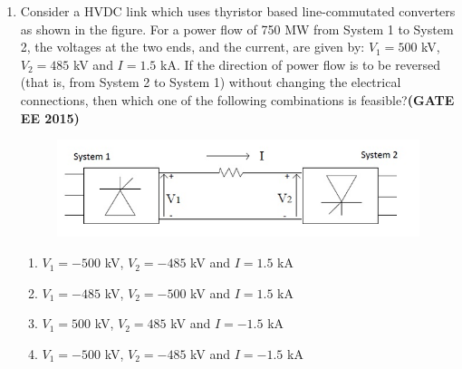 \documentclass[a4paper,12pt]{exam}
\theoremstyle{remark}
\begin{document}
\begin{enumerate}
\begin{multicols}{4}
\begin{enumerate}
        \item 1010
        \item 0110
        \item 1000
        \item 1110
    \end{enumerate}
\end{multicols}
\item Consider a HVDC link which uses thyristor based line-commutated converters as shown in the figure. For a power flow of 750 MW from System 1 to System 2, the voltages at the two ends, and the current, are given by: $V_1 = 500$ kV, $V_2 = 485$ kV and $I = 1.5$ kA. If the direction of power flow is to be reversed (that is, from System 2 to System 1) without changing the electrical connections, then which one of the following combinations is feasible?\hfill{\textbf{(GATE EE 2015)}}
\begin{figure}[H]
    \centering
    \includegraphics[width=0.5\columnwidth]{figs/Q 26.png}
    \caption{}
    \label{fig:placeholder}
\end{figure}
    \begin{enumerate}
        \item $V_1 = -500$ kV, $V_2 = -485$ kV and $I = 1.5$ kA
        \item $V_1 = -485$ kV, $V_2 = -500$ kV and $I = 1.5$ kA
        \item $V_1 = 500$ kV, $V_2 = 485$ kV and $I = -1.5$ kA
        \item $V_1 = -500$ kV, $V_2 = -485$ kV and $I = -1.5$ kA
    \end{enumerate}


\end{enumerate}
\end{document}
